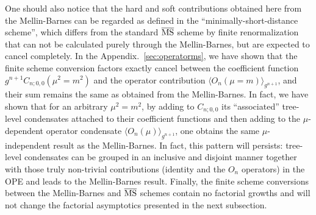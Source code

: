 \documentclass[a4paper,11pt]{article}
\begin{document}
One should also notice that the hard and soft contributions obtained here from the Mellin-Barnes can be regarded as defined in the ``minimally-short-distance scheme'', which differs from the standard $\overline{\rm MS}$ scheme by finite renormalization that can not be calculated purely through the Mellin-Barnes, but are expected to cancel completely. In the Appendix.~\ref{sec:operatorms}, we have shown that the finite scheme conversion factors exactly cancel between the coefficient function $g^{n+1}C_{n;0,0}(\mu^2=m^2)$ and the operator contribution $\langle O_n(\mu=m) \rangle_{g^{n+1}}$, and their sum remains the same as obtained from the Mellin-Barnes. In fact, we have shown that for an arbitrary $\mu^2=m^2$, by adding to $C_{n;0,0}$ its ``associated'' tree-level condensates attached to their coefficient functions and then adding to the $\mu$-dependent operator condensate $\langle O_n(\mu) \rangle_{g^{n+1}}$, one obtains the same $\mu$-independent result as the Mellin-Barnes. In fact, this pattern will persists: tree-level condensates can be grouped in an inclusive and disjoint manner together with those truly non-trivial contributions (identity and the $O_n$ operators) in the OPE and leads to the Mellin-Barnes result.  Finally, the finite scheme conversions between the 
Mellin-Barnes and $\overline{\rm MS}$ schemes contain no factorial growths and will not change the factorial asymptotics presented in the next subsection. 
\end{document}
